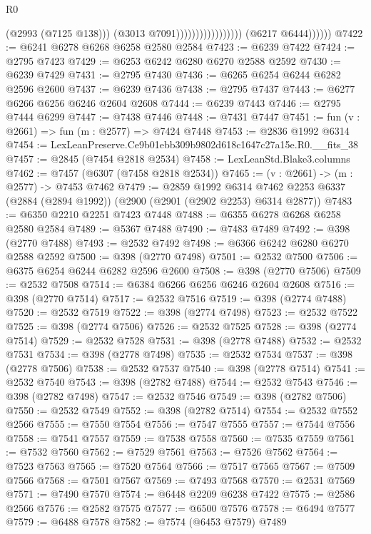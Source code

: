 \begin{lexlean}{R0}
\begin{coremodule}
                                                (@2993 (@7125 @138)))
                                              (@3013 @7091)))))))))))))))))
              (@6217 @6444))))))
@7422 := @6241 @6278 @6268 @6258 @2580 @2584
@7423 := @6239 @7422
@7424 := @2795 @7423
@7429 := @6253 @6242 @6280 @6270 @2588 @2592
@7430 := @6239 @7429
@7431 := @2795 @7430
@7436 := @6265 @6254 @6244 @6282 @2596 @2600
@7437 := @6239 @7436
@7438 := @2795 @7437
@7443 := @6277 @6266 @6256 @6246 @2604 @2608
@7444 := @6239 @7443
@7446 := @2795 @7444 @6299
@7447 := @7438 @7446
@7448 := @7431 @7447
@7451 := fun (v : @2661) => fun (m : @2577) => @7424 @7448
@7453 := @2836 @1992 @6314
@7454 := LexLeanPreserve.Ce9b01ebb309b9802d618c1647c27a15e.R0.__fits_38
@7457 := @2845 (@7454 @2818 @2534)
@7458 := LexLeanStd.Blake3.columns
@7462 := @7457 (@6307 (@7458 @2818 @2534))
@7465 := (v : @2661) -> (m : @2577) -> @7453 @7462
@7479 := @2859
    @1992
    @6314
    @7462
    @2253
    @6337
    (@2884 (@2894 @1992))
    (@2900 (@2901 (@2902 @2253) @6314 @2877))
@7483 := @6350 @2210 @2251 @7423 @7448
@7488 := @6355 @6278 @6268 @6258 @2580 @2584
@7489 := @5367 @7488
@7490 := @7483 @7489
@7492 := @398 (@2770 @7488)
@7493 := @2532 @7492
@7498 := @6366 @6242 @6280 @6270 @2588 @2592
@7500 := @398 (@2770 @7498)
@7501 := @2532 @7500
@7506 := @6375 @6254 @6244 @6282 @2596 @2600
@7508 := @398 (@2770 @7506)
@7509 := @2532 @7508
@7514 := @6384 @6266 @6256 @6246 @2604 @2608
@7516 := @398 (@2770 @7514)
@7517 := @2532 @7516
@7519 := @398 (@2774 @7488)
@7520 := @2532 @7519
@7522 := @398 (@2774 @7498)
@7523 := @2532 @7522
@7525 := @398 (@2774 @7506)
@7526 := @2532 @7525
@7528 := @398 (@2774 @7514)
@7529 := @2532 @7528
@7531 := @398 (@2778 @7488)
@7532 := @2532 @7531
@7534 := @398 (@2778 @7498)
@7535 := @2532 @7534
@7537 := @398 (@2778 @7506)
@7538 := @2532 @7537
@7540 := @398 (@2778 @7514)
@7541 := @2532 @7540
@7543 := @398 (@2782 @7488)
@7544 := @2532 @7543
@7546 := @398 (@2782 @7498)
@7547 := @2532 @7546
@7549 := @398 (@2782 @7506)
@7550 := @2532 @7549
@7552 := @398 (@2782 @7514)
@7554 := @2532 @7552 @2566
@7555 := @7550 @7554
@7556 := @7547 @7555
@7557 := @7544 @7556
@7558 := @7541 @7557
@7559 := @7538 @7558
@7560 := @7535 @7559
@7561 := @7532 @7560
@7562 := @7529 @7561
@7563 := @7526 @7562
@7564 := @7523 @7563
@7565 := @7520 @7564
@7566 := @7517 @7565
@7567 := @7509 @7566
@7568 := @7501 @7567
@7569 := @7493 @7568
@7570 := @2531 @7569
@7571 := @7490 @7570
@7574 := @6448 @2209 @6238 @7422
@7575 := @2586 @2566
@7576 := @2582 @7575
@7577 := @6500 @7576
@7578 := @6494 @7577
@7579 := @6488 @7578
@7582 := @7574 (@6453 @7579) @7489

\end{coremodule}
\end{lexlean}
